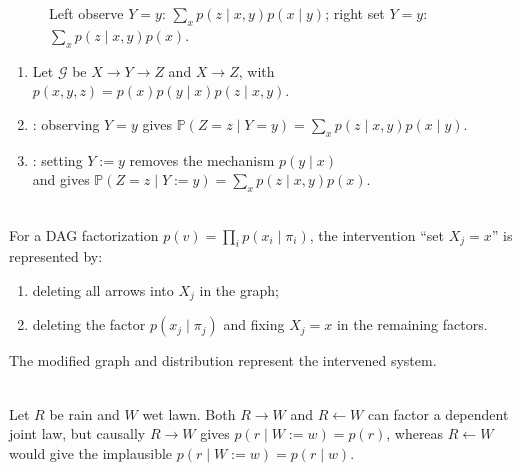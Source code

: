 \begin{figure}[H]
  \centering
  
  \caption{Left observe $Y=y$: $\sum_x p(z\mid x,y)p(x\mid y)$; right set $Y=y$: $\sum_x p(z\mid x,y)p(x)$.}
  \label{fig:conditioning-versus-intervention}
\end{figure}

\begin{definition} \label{def:passive-and-active-conditioning} 
\begin{enumerate}[label=(\roman*)]
\setlength{\itemsep}{0pt}
\item Let $\mathcal{G}$ be $X\to Y\to Z$ and $X\to Z$, with $p(x,y,z)=p(x)p(y\mid x)p(z\mid x,y)$.
\item {}: observing $Y=y$ gives $\mathbb{P}(Z=z\mid Y=y)=\sum_x p(z\mid x,y)p(x\mid y)$.
\item {}: setting $Y:=y$ removes the mechanism $p(y\mid x)$\\
and gives $\mathbb{P}(Z=z\mid Y:=y)=\sum_x p(z\mid x,y)p(x)$.
\end{enumerate}
\end{definition}

\begin{method} \label{meth:dag-intervention-truncated-factorization} \\
For a DAG factorization $p(v)=\prod_i p(x_i\mid \pi_i)$, the intervention ``set $X_j=x$'' is represented by:
\begin{enumerate}[label=(\roman*)]
\setlength{\itemsep}{0pt}
\item deleting all arrows into $X_j$ in the graph;
\item deleting the factor $p(x_j\mid \pi_j)$ and fixing $X_j=x$ in the remaining factors.
\end{enumerate}
The modified graph and distribution represent the intervened system.
\end{method}

\begin{example} \label{ex:rain-wet-lawn-causal-direction} \\
Let $R$ be rain and $W$ wet lawn. Both $R\to W$ and $R\leftarrow W$ can factor a dependent joint law, but causally $R\to W$ gives $p(r\mid W:=w)=p(r)$, whereas $R\leftarrow W$ would give the implausible $p(r\mid W:=w)=p(r\mid w)$.
\end{example}

